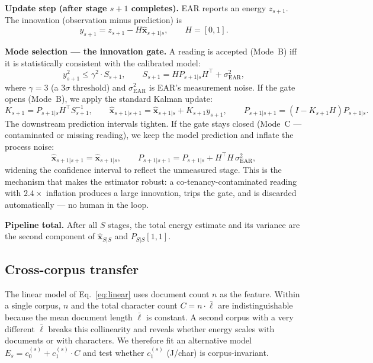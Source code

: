 \documentclass{article}
\begin{document}
\textbf{Update step (after stage $s+1$ completes).} EAR reports an energy $z_{s+1}$. The innovation (observation minus prediction) is
\begin{equation}
  y_{s+1} = z_{s+1} - H \hat{\mathbf{x}}_{s+1|s},
  \qquad H = [0, 1].
  \label{eq:innovation}
\end{equation}

\textbf{Mode selection --- the innovation gate.} A reading is accepted (Mode~B) iff it is statistically consistent with the calibrated model:
\begin{equation}
  y_{s+1}^2 \le \gamma^2 \cdot S_{s+1},
  \qquad S_{s+1} = H P_{s+1|s} H^\top + \sigma^2_{\mathrm{EAR}},
  \label{eq:gate}
\end{equation}
where $\gamma = 3$ (a $3\sigma$ threshold) and $\sigma^2_{\mathrm{EAR}}$ is EAR's measurement noise. If the gate opens (Mode~B), we apply the standard Kalman update:
\begin{equation}
  K_{s+1} = P_{s+1|s} H^\top S_{s+1}^{-1},
  \qquad
  \hat{\mathbf{x}}_{s+1|s+1} = \hat{\mathbf{x}}_{s+1|s} + K_{s+1} y_{s+1},
  \qquad
  P_{s+1|s+1} = (I - K_{s+1} H) P_{s+1|s}.
  \label{eq:update}
\end{equation}
The downstream prediction intervals tighten. If the gate stays closed (Mode~C --- contaminated or missing reading), we keep the model prediction and inflate the process noise:
\begin{equation}
  \hat{\mathbf{x}}_{s+1|s+1} = \hat{\mathbf{x}}_{s+1|s},
  \qquad
  P_{s+1|s+1} = P_{s+1|s} + H^\top H \, \sigma^2_{\mathrm{EAR}},
  \label{eq:reject}
\end{equation}
widening the confidence interval to reflect the unmeasured stage. This is the mechanism that makes the estimator robust: a co-tenancy-contaminated reading with $2.4\times$ inflation produces a large innovation, trips the gate, and is discarded automatically --- no human in the loop.

\textbf{Pipeline total.} After all $S$ stages, the total energy estimate and its variance are the second component of $\hat{\mathbf{x}}_{S|S}$ and $P_{S|S}[1,1]$.

\subsection{Cross-corpus transfer}

\label{sec:chars}

The linear model of Eq.~\eqref{eq:linear} uses document count $n$ as the feature. Within a single corpus, $n$ and the total character count $C = n \cdot \bar{\ell}$ are indistinguishable because the mean document length $\bar{\ell}$ is constant. A second corpus with a very different $\bar{\ell}$ breaks this collinearity and reveals whether energy scales with documents or with characters. We therefore fit an alternative model $E_s = c_0^{(s)} + c_1^{(s)} \cdot C$ and test whether $c_1^{(s)}$ (J/char) is corpus-invariant.
\end{document}
